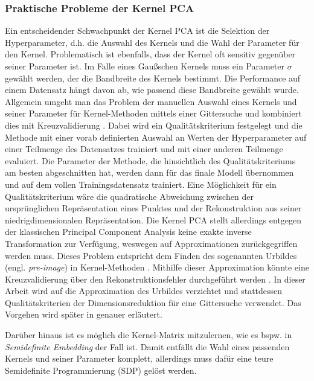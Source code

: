 \subsubsection{Praktische Probleme der Kernel PCA}
\label{ch:MethodenDerDimRed:statistisch:kPCA:AuswahlKF}

Ein entscheidender Schwachpunkt der Kernel PCA ist die Selektion der Hyperparameter, d.h. die
Auswahl des Kernels und die Wahl der Parameter für den Kernel. Problematisch ist ebenfalls, dass
der Kernel oft sensitiv gegenüber seiner Parameter ist. Im Falle eines Gaußschen Kernels muss ein
Parameter $\sigma$ gewählt werden, der die Bandbreite des Kernels bestimmt. Die Performance auf
einem Datensatz hängt davon ab, wie passend diese Bandbreite gewählt wurde. Allgemein umgeht man
das Problem der manuellen Auswahl eines Kernels und seiner Parameter für Kernel-Methoden mittels
einer Gittersuche und kombiniert dies mit Kreuzvalidierung \parencite[1]{Alam.2014}. Dabei wird ein Qualitätskriterium festgelegt und die Methode mit einer vorab
definierten Auswahl an Werten der Hyperparameter auf einer Teilmenge des Datensatzes trainiert und
mit einer anderen Teilmenge evaluiert. Die Parameter der Methode, die hinsichtlich des
Qualitätskriteriums am besten abgeschnitten hat, werden dann für das finale Modell übernommen und
auf dem vollen Trainingsdatensatz trainiert. Eine Möglichkeit für ein Qualitätskriterium wäre die
quadratische Abweichung zwischen der ursprünglichen Repräsentation eines Punktes und der
Rekonstruktion aus seiner niedrigdimensionalen Repräsentation. Die Kernel PCA stellt allerdings
entgegen der klassischen Principal Component Analysis keine exakte inverse Transformation zur
Verfügung, weswegen auf Approximationen zurückgegriffen werden muss. Dieses Problem entspricht dem
Finden des sogenannten Urbildes (engl. \textit{pre-image}) in Kernel-Methoden \parencite{Kwok.2004}. Mithilfe dieser Approximation könnte eine Kreuzvalidierung über den
Rekonstruktionsfehler durchgeführt werden \parencite[siehe z.B.][]{Alam.2014}. In dieser Arbeit wird auf die Approximation des Urbildes
verzichtet und stattdessen Qualitätskriterien der Dimensionsreduktion für eine Gittersuche
verwendet. Das Vorgehen wird später in 
genauer erläutert.

Darüber hinaus ist es möglich die Kernel-Matrix mitzulernen, wie es bspw. in \textit{Semidefinite
	Embedding} \parencite{Weinberger.2004b} der Fall ist. Damit entfällt die Wahl eines passenden Kernels und seiner
Parameter komplett, allerdings muss dafür eine teure Semidefinite Programmierung (SDP) gelöst
werden.

